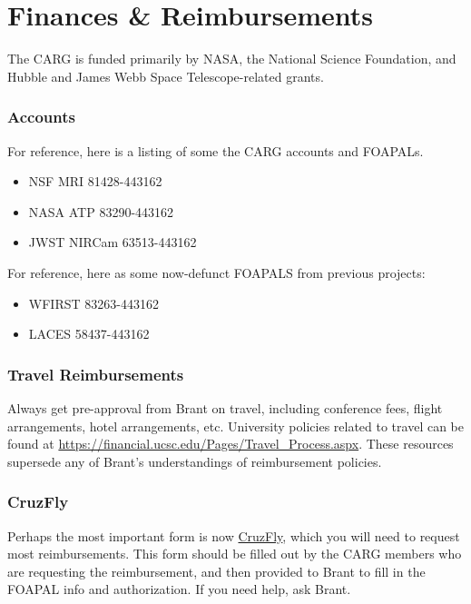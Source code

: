\section{Finances \& Reimbursements}
\label{sec:finances}

The CARG is funded primarily by
NASA,
the National Science Foundation,
and Hubble and James Webb Space
Telescope-related grants. 

\subsubsection{Accounts}
For reference, here is a listing of some the CARG accounts and FOAPALs.
\begin{itemize}
\item NSF MRI 81428-443162
\item NASA ATP 83290-443162
\item JWST NIRCam 63513-443162
\end{itemize}

For reference, here as some now-defunct FOAPALS from previous projects:

\begin{itemize}
\item WFIRST 83263-443162
\item LACES 58437-443162
\end{itemize}

\subsubsection{Travel Reimbursements}

Always get pre-approval from 
Brant on travel,
including conference fees,
flight arrangements, 
hotel arrangements, etc. 
University policies related to
travel can be found at \href{https://financial.ucsc.edu/Pages/Travel_Process.aspx}{https://financial.ucsc.edu/Pages/Travel\_Process.aspx}. These resources
supersede any of Brant's 
understandings of reimbursement
policies.\\

\subsubsection{CruzFly}

\noindent
Perhaps the most important form is now 
\href{http://cruzfly.ucsc.edu/}{CruzFly}, which
you will need to request most reimbursements.
This form should be filled out by
the CARG members who are 
requesting the reimbursement, and
then provided to Brant to fill in
the FOAPAL info and authorization.
If you need help, ask Brant.

